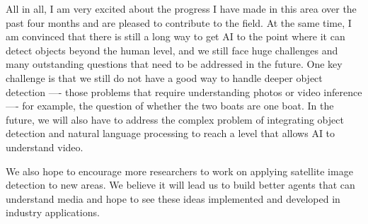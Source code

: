 All in all, I am very excited about the progress I have made in this area over the past four months and are pleased to contribute to the field. At the same time, I am convinced that there is still a long way to get AI to the point where it can detect objects beyond the human level, and we still face huge challenges and many outstanding questions that need to be addressed in the future. One key challenge is that we still do not have a good way to handle deeper object detection ---- those problems that require understanding photos or video inference ---- for example, the question of whether the two boats are one boat. In the future, we will also have to address the complex problem of integrating object detection and natural language processing to reach a level that allows AI to understand video.

We also hope to encourage more researchers to work on applying satellite image detection to new areas. We believe it will lead us to build better agents that can understand media and hope to see these ideas implemented and developed in industry applications.